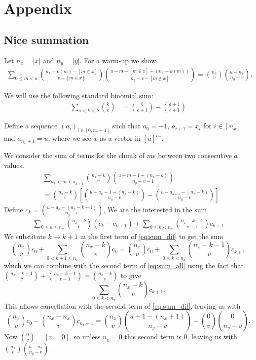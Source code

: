 
\section{Appendix}

\subsection{Nice summation}
Let $n_x=|x|$ and $n_y=|y|$.
For a warm-up we show
\begin{align}
   \sum_{0\le m < u}
   \binom{n_x-k(m)-[m\in x]}{v-[m\in x]}
   \binom{u-m-[m\not\in x]-(n_x-k(m))}{n_y-v-[m\not\in x]}
   = \binom{n_x}{v}\binom{u-n_x}{n_y-v}
   .
\end{align}

We will use the following standard binomial sum:
\begin{align}
   \sum_{a<k<b}\binom{k}{c} &= \binom{b}{c+1} - \binom{a+1}{c+1}
\end{align}

Define a sequence $(a_i)_{i\in[0,n_x+1]}$ such that $a_0=-1$, $a_{i+1} = x_i$ for $i\in[n_x]$ and $a_{n_x+1}=u$,
where we see $x$ as a vector in $[u]^{n_x}$.

We consider the sum of terms for the chunk of $m$s between two consecutive $a$ values.
\begin{align}
   &
   \sum_{a_k < m < a_{k+1}}
   \binom{n_x-k}{v}
   \binom{u-m-1-(n_x-k)}{n_y-v-1}
   \\&=
   \binom{n_x-k}{v}
   \left[
   \binom{u-a_k-1-(n_x-k)}{n_y-v}
   -
   \binom{u-a_{k+1}-(n_x-k)}{n_y-v}
\right]
   \label{eq:sum_dif}
\end{align}
Define $c_k = \binom{u-a_k-(n_x-k+1)}{n_y-v}$,
We are the interested in the sum
\begin{align}
   \sum_{0\le k \le n_x}
   \binom{n_x-k}{v}(c_k-c_{k+1})
   +
   \sum_{0\le k < n_x}
   \binom{n_x-k-1}{v-1}c_{k+1}
   \label{eq:sum_all}
\end{align}
We substitute $k\mapsto k+1$ in the first term of \eqref{eq:sum_dif} to get the sum
\[
   \binom{n_x}{v}c_0
   +
   \sum_{0 < k+1 \le n_x}
   \binom{n_x-k}{v}
   c_k
   =
   \binom{n_x}{v}c_0
   +
   \sum_{0 \le k < n_x}
   \binom{n_x-k-1}{v}
   c_{k+1}
\]
which we can combine with the second term of \eqref{eq:sum_all}
using the fact that $\binom{n_x-k-1}{v} + \binom{n_x-k-1}{v-1} = \binom{n_x-k}{v}$
to give
\[
   \sum_{0\le k < n_x}
   \binom{n_x-k}{v}
   c_{k+1}
   .
\]
This allows cancellation with the second term of \eqref{eq:sum_dif},
leaving us with
\[
   \binom{n_x}{v}c_0
   -
   \binom{n_x-n_x}{v}c_{n_x+1}
   =
   \binom{n_x}{v}\binom{u+1-(n_x+1)}{n_y-v}
   -
   \binom{0}{v}
   \binom{0}{n_y-v}.
\]
Now $\binom{0}{v}=[v=0]$, so unless $n_y=0$ this second term is 0, leaving us with
$\binom{n_x}{v}\binom{u-n_x}{n_y-v}$.

